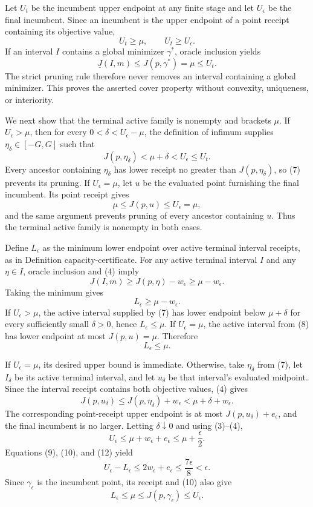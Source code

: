 Let \(U_t\) be the incumbent upper endpoint at any finite stage and let \(U_\epsilon\) be the final incumbent.  Since an incumbent is the upper endpoint of a point receipt containing its objective value,
\[
 U_t\geq\mu,
 \qquad U_t\geq U_\epsilon.
\tag{5}
\]
If an interval \(I\) contains a global minimizer \(\gamma^*\), oracle inclusion yields
\[
 \underline J(I,m)\leq J(p,\gamma^*)=\mu\leq U_t.
\tag{6}
\]
The strict pruning rule therefore never removes an interval containing a global minimizer.  This proves the asserted cover property without convexity, uniqueness, or interiority.

We next show that the terminal active family is nonempty and brackets \(\mu\).  If \(U_\epsilon>\mu\), then for every \(0<\delta<U_\epsilon-\mu\), the definition of infimum supplies \(\eta_\delta\in[-G,G]\) such that
\[
 J(p,\eta_\delta)<\mu+\delta<U_\epsilon\leq U_t.
\tag{7}
\]
Every ancestor containing \(\eta_\delta\) has lower receipt no greater than \(J(p,\eta_\delta)\), so (7) prevents its pruning.  If \(U_\epsilon=\mu\), let \(u\) be the evaluated point furnishing the final incumbent.  Its point receipt gives
\[
 \mu\leq J(p,u)\leq U_\epsilon=\mu,
\tag{8}
\]
and the same argument prevents pruning of every ancestor containing \(u\).  Thus the terminal active family is nonempty in both cases.

Define \(L_\epsilon\) as the minimum lower endpoint over active terminal interval receipts, as in Definition \(\mathrm{capacity\mbox{-}certificate}\).  For any active terminal interval \(I\) and any \(\eta\in I\), oracle inclusion and (4) imply
\[
 \underline J(I,m)\geq J(p,\eta)-w_\epsilon\geq\mu-w_\epsilon.
\]
Taking the minimum gives
\[
 L_\epsilon\geq\mu-w_\epsilon.
\tag{9}
\]
If \(U_\epsilon>\mu\), the active interval supplied by (7) has lower endpoint below \(\mu+\delta\) for every sufficiently small \(\delta>0\), hence \(L_\epsilon\leq\mu\).  If \(U_\epsilon=\mu\), the active interval from (8) has lower endpoint at most \(J(p,u)=\mu\).  Therefore
\[
 L_\epsilon\leq\mu.
\tag{10}
\]

If \(U_\epsilon=\mu\), its desired upper bound is immediate.  Otherwise, take \(\eta_\delta\) from (7), let \(I_\delta\) be its active terminal interval, and let \(u_\delta\) be that interval's evaluated midpoint.  Since the interval receipt contains both objective values, (4) gives
\[
 J(p,u_\delta)\leq J(p,\eta_\delta)+w_\epsilon
 <\mu+\delta+w_\epsilon.
\tag{11}
\]
The corresponding point-receipt upper endpoint is at most \(J(p,u_\delta)+e_\epsilon\), and the final incumbent is no larger.  Letting \(\delta\downarrow0\) and using (3)--(4),
\[
 U_\epsilon\leq\mu+w_\epsilon+e_\epsilon
 \leq\mu+\frac\epsilon2.
\tag{12}
\]
Equations (9), (10), and (12) yield
\[
 U_\epsilon-L_\epsilon
 \leq2w_\epsilon+e_\epsilon
 \leq\frac{7\epsilon}{8}<\epsilon.
\tag{13}
\]
Since \(\gamma_\epsilon\) is the incumbent point, its receipt and (10) also give
\[
 L_\epsilon\leq\mu
 \leq J(p,\gamma_\epsilon)\leq U_\epsilon.
\tag{14}
\]

